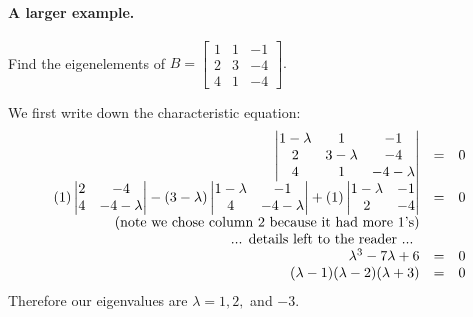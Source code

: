 \paragraph{A larger example. }
Find the eigenelements of $B=\begin{bmatrix}1&1&-1\\2&3&-4\\4&1&-4\end{bmatrix}.$

We first write down the characteristic equation:
\[\begin{array}{rcl}
\left|\begin{matrix}1-\lambda&1&-1\\2&3-\lambda&-4\\4&1&-4-\lambda\end{matrix}\right| & = & 0\\
(1)\left|\begin{matrix}2&-4\\4&-4-\lambda\end{matrix}\right| - 
(3-\lambda)\left|\begin{matrix}1-\lambda&-1\\4&-4-\lambda\end{matrix}\right| + 
(1)\left|\begin{matrix}1-\lambda&-1\\2&-4\end{matrix}\right| & = & 0\\
\textnormal{(note we chose column 2 because it had more 1's)}\\
\textnormal{... details left to the reader ... }\\
\lambda^3 -7 \lambda + 6 & = & 0\\
(\lambda-1)(\lambda-2)(\lambda+3) & = & 0\\
\end{array}\]
Therefore our eigenvalues are $\lambda=1,2,$ and $-3$. 

